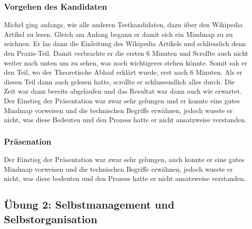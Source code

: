 \subsubsection{Vorgehen des Kandidaten} \label{bemmic}
Michel ging anfangs, wie alle anderen Testkandidaten, dazu über den Wikipedia Artikel zu lesen. Gleich am Anfang begann er damit sich ein Mindmap zu zu zeichnen. Er las dann die Einleitung des Wikipedia Artikels und schliesslich denn den Praxis-Teil. Damit verbrachte er die ersten 6 Minuten und Scrollte auch nicht weiter nach unten um zu sehen, was noch wichtigeres stehen könnte. Somit sah er den Teil, wo der Theoretische Ablauf erklärt wurde, erst nach 6 Minuten. Als er diesen Teil dann auch gelesen hatte, scrollte er schlussendlich alles durch. Die Zeit war dann bereits abgelaufen und das Resultat war dann auch wie erwartet. Der Einstieg der Präsentation war zwar sehr gelungen und er konnte eine gutes Mindmap vorweisen und die technischen Begriffe erwähnen, jedoch wusste er nicht, was diese Bedeuten und den Prozess hatte er nicht ansatzweise verstanden. 

\subsubsection{Präsenation}

Der Einstieg der Präsentation war zwar sehr gelungen, auch konnte er eine gutes Mindmap vorweisen und die technischen Begriffe erwähnen, jedoch wusste er nicht, was diese bedeuten und den Prozess hatte er nicht ansatzweise verstanden. 

\subsection{Übung 2: Selbstmanagement und Selbstorganisation}

